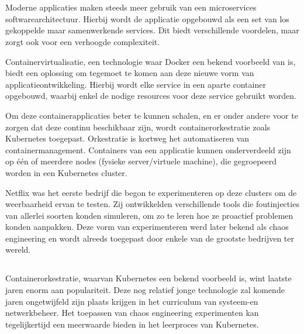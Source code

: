 
\chapter{}
\label{ch:inleiding}

Moderne applicaties maken steeds meer gebruik van een microservices softwarearchitectuur. Hierbij wordt de applicatie opgebouwd als een set van los gekoppelde maar samenwerkende services. Dit biedt verschillende voordelen, maar zorgt ook voor een verhoogde complexiteit. 

Containervirtualisatie, een technologie waar Docker een bekend voorbeeld van is, biedt een oplossing om tegemoet te komen aan deze nieuwe vorm van applicatieontwikkeling. Hierbij wordt elke service in een aparte container opgebouwd, waarbij enkel de nodige resources voor deze service gebruikt worden. 

Om deze containerapplicaties beter te kunnen schalen, en er onder andere voor te zorgen dat deze continu beschikbaar zijn, wordt containerorkestratie zoals Kubernetes toegepast. Orkestratie is kortweg het automatiseren van containermanagement. Containers van een applicatie kunnen onderverdeeld zijn op één of meerdere nodes (fysieke server/virtuele machine), die gegroepeerd worden in een Kubernetes cluster. 

Netflix was het eerste bedrijf die begon te experimenteren op deze clusters om de weerbaarheid ervan te testen. Zij ontwikkelden verschillende tools die foutinjecties van allerlei soorten konden simuleren, om zo te leren hoe ze proactief problemen konden aanpakken. Deze vorm van experimenteren werd later bekend als chaos engineering en wordt alreeds toegepast door enkele van de grootste bedrijven ter wereld.    

\section{}
\label{sec:probleemstelling}

Containerorkestratie, waarvan Kubernetes een bekend voorbeeld is, wint laatste jaren enorm aan populariteit. Deze nog relatief jonge technologie zal komende jaren ongetwijfeld zijn plaats krijgen in het curriculum van systeem-en netwerkbeheer. Het toepassen van chaos engineering experimenten kan tegelijkertijd een meerwaarde bieden in het leerproces van Kubernetes. 

